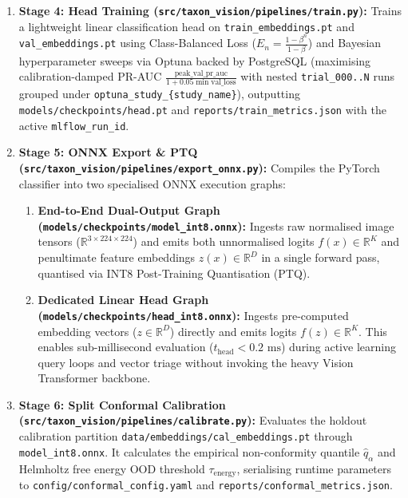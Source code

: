 \begin{enumerate}
    \item \textbf{Stage 4: Head Training (\texttt{src/taxon\_vision/pipelines/train.py}):} Trains a lightweight linear classification head on \nolinkurl{train_embeddings.pt} and \nolinkurl{val_embeddings.pt} using Class-Balanced Loss ($E_n = \frac{1-\beta^n}{1-\beta}$) and Bayesian hyperparameter sweeps via Optuna backed by PostgreSQL (maximising calibration-damped PR-AUC $\frac{\text{peak\_val\_pr\_auc}}{1 + 0.05 \min \text{val\_loss}}$ with nested \nolinkurl{trial_000..N} runs grouped under \nolinkurl{optuna_study_{study_name}}), outputting \nolinkurl{models/checkpoints/head.pt} and \nolinkurl{reports/train_metrics.json} with the active \nolinkurl{mlflow_run_id}.
    \item \textbf{Stage 5: ONNX Export \& PTQ (\texttt{src/taxon\_vision/pipelines/export\_onnx.py}):} Compiles the PyTorch classifier into two specialised ONNX execution graphs:
    \begin{enumerate}[label=(\alph*)]
        \item \textbf{End-to-End Dual-Output Graph (\nolinkurl{models/checkpoints/model_int8.onnx}):} Ingests raw normalised image tensors ($\mathbb{R}^{3 \times 224 \times 224}$) and emits both unnormalised logits $f(x) \in \mathbb{R}^K$ and penultimate feature embeddings $z(x) \in \mathbb{R}^D$ in a single forward pass, quantised via INT8 Post-Training Quantisation (PTQ).
        \item \textbf{Dedicated Linear Head Graph (\nolinkurl{models/checkpoints/head_int8.onnx}):} Ingests pre-computed embedding vectors ($z \in \mathbb{R}^D$) directly and emits logits $f(z) \in \mathbb{R}^K$. This enables sub-millisecond evaluation ($t_{\text{head}} < 0.2\text{ ms}$) during active learning query loops and vector triage without invoking the heavy Vision Transformer backbone.
    \end{enumerate}
    \item \textbf{Stage 6: Split Conformal Calibration (\texttt{src/taxon\_vision/pipelines/calibrate.py}):} Evaluates the holdout calibration partition \nolinkurl{data/embeddings/cal_embeddings.pt} through \nolinkurl{model_int8.onnx}. It calculates the empirical non-conformity quantile $\hat{q}_\alpha$ and Helmholtz free energy OOD threshold $\tau_{\text{energy}}$, serialising runtime parameters to \nolinkurl{config/conformal_config.yaml} and \nolinkurl{reports/conformal_metrics.json}.

\end{enumerate}
